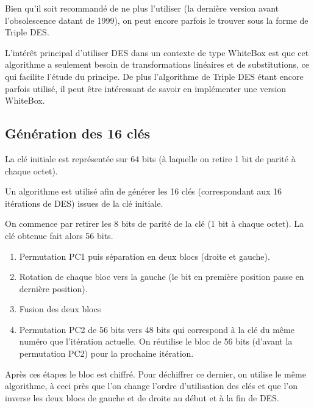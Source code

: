 \documentclass[a4paper,12pt]{article}
\begin{document}
Bien qu'il soit recommandé de ne plus l'utiliser (la dernière version avant l'obsolescence datant de 1999), on peut encore parfois le trouver sous la forme de Triple DES.
	
L'intérêt principal d'utiliser DES dans un contexte de type WhiteBox est que cet algorithme a seulement besoin de transformations linéaires et de substitutions, ce qui facilite l'étude du principe. De plus l'algorithme de Triple DES étant encore parfois utilisé, il peut être intéressant de savoir en implémenter une version WhiteBox.
	
\subsection{Génération des 16 clés}	
	
La clé initiale est représentée sur 64 bits (à laquelle on retire 1 bit de parité à chaque octet). 

Un algorithme est utilisé afin de générer les 16 clés (correspondant aux 16 itérations de DES) issues de la clé initiale. 
	
On commence par retirer les 8 bits de parité de la clé (1 bit à chaque octet). La clé obtenue fait alors 56 bits.
\begin{enumerate}
\item Permutation PC1 puis séparation en deux blocs (droite et gauche).
\item Rotation de chaque bloc vers la gauche (le bit en première position passe en dernière position).
\item Fusion des deux blocs
\item Permutation PC2 de 56 bits vers 48 bits qui correspond à la clé du même numéro que l'itération actuelle. On réutilise le bloc de 56 bits (d'avant la permutation PC2) pour la prochaine itération.
\end{enumerate}

Après ces étapes le bloc est chiffré. Pour déchiffrer ce dernier, on utilise le même algorithme, à ceci près que l'on change l'ordre d'utilisation des clés et que l'on inverse les deux blocs de gauche et de droite au début et à la fin de DES.
\end{document}
